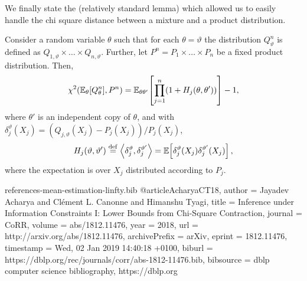 \documentclass[10pt]{article}
\newcommand{\ns}{n}
\begin{document}
We finally state the (relatively standard lemma) which allowed us to easily handle the chi square distance between a mixture and a product distribution.
\begin{lemma}\label{lem:mixture_chisquare}
Consider a random variable $\theta$ such that for each
$\theta=\vartheta$ the distribution $Q_\vartheta^\ns$ is defined as
$Q_{1,\vartheta} \times \dots \times Q_{n,\vartheta}$. Further, let
$P^\ns = P_1 \times \dots \times P_\ns$ be a fixed product
distribution. Then,
\[
\chi^2(\shortexpect_{\theta}[Q_\theta^\ns], P^\ns) = \shortexpect_{\theta\theta'}{\mleft[\prod_{j=1}^\ns (1+{H_j(\theta,\theta')})\mright]} - 1,
\]
where $\theta'$ is an independent copy of $\theta$, and with
$\delta_j^\vartheta(X_j) = (Q_{j,\vartheta}(X_j)-P_j(X_j))/P_j(X_j)$,
\[
H_j(\vartheta,\vartheta') \stackrel{\rm def}{=} \left\langle \delta_j^\vartheta, \delta_j^{\vartheta'} \right\rangle=\mathbb{E}\!\left[\delta_j^\vartheta(X_j)\delta_j^{\vartheta'}(X_j)\right],
\]
where the expectation is over $X_j$ distributed according to $P_j$.
\end{lemma}

\begin{filecontents}{references-mean-estimation-linfty.bib}
@article{AcharyaCT18,
  author    = {Jayadev Acharya and
               Cl{\'{e}}ment L. Canonne and
               Himanshu Tyagi},
  title     = {Inference under Information Constraints {I:} Lower Bounds from Chi-Square
               Contraction},
  journal   = {CoRR},
  volume    = {abs/1812.11476},
  year      = {2018},
  url       = {http://arxiv.org/abs/1812.11476},
  archivePrefix = {arXiv},
  eprint    = {1812.11476},
  timestamp = {Wed, 02 Jan 2019 14:40:18 +0100},
  biburl    = {https://dblp.org/rec/journals/corr/abs-1812-11476.bib},
  bibsource = {dblp computer science bibliography, https://dblp.org}
}

\end{filecontents}


\end{document}
